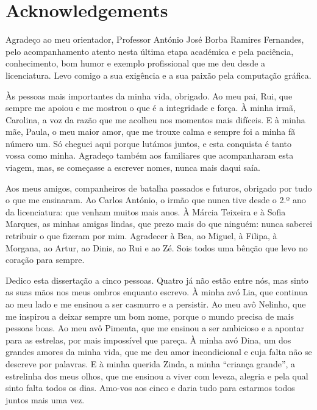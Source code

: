 \chapter*{Acknowledgements}
\setlength{\parskip}{1em}

Agradeço ao meu orientador, Professor António José Borba Ramires Fernandes, pelo acompanhamento atento nesta última etapa académica e pela paciência, conhecimento, bom humor e exemplo profissional que me deu desde a licenciatura. Levo comigo a sua exigência e a sua paixão pela computação gráfica.

Às pessoas mais importantes da minha vida, obrigado. Ao meu pai, Rui, que sempre me apoiou e me mostrou o que é a integridade e força. À minha irmã, Carolina, a voz da razão que me acolheu nos momentos mais difíceis. E à minha mãe, Paula, o meu maior amor, que me trouxe calma e sempre foi a minha fã número um. Só cheguei aqui porque lutámos juntos, e esta conquista é tanto vossa como minha. Agradeço também aos familiares que acompanharam esta viagem, mas, se começasse a escrever nomes, nunca mais daqui saía.

Aos meus amigos, companheiros de batalha passados e futuros, obrigado por tudo o que me ensinaram. Ao Carlos António, o irmão que nunca tive desde o 2.º ano da licenciatura: que venham muitos mais anos. À Márcia Teixeira e à Sofia Marques, as minhas amigas lindas, que prezo mais do que ninguém: nunca saberei retribuir o que fizeram por mim. Agradecer à Bea, ao Miguel, à Filipa, à Morgana, ao Artur, ao Dinis, ao Rui e ao Zé. Sois todos uma bênção que levo no coração para sempre.

Dedico esta dissertação a cinco pessoas. Quatro já não estão entre nós, mas sinto as suas mãos nos meus ombros enquanto escrevo. À minha avó Lia, que continua ao meu lado e me ensinou a ser casmurro e a persistir. Ao meu avô Nelinho, que me inspirou a deixar sempre um bom nome, porque o mundo precisa de mais pessoas boas. Ao meu avô Pimenta, que me ensinou a ser ambicioso e a apontar para as estrelas, por mais impossível que pareça. À minha avó Dina, um dos grandes amores da minha vida, que me deu amor incondicional e cuja falta não se descreve por palavras. E à minha querida Zinda, a minha “criança grande”, a estrelinha dos meus olhos, que me ensinou a viver com leveza, alegria e pela qual sinto falta todos os dias. Amo-vos aos cinco e daria tudo para estarmos todos juntos mais uma vez.

\setlength{\parskip}{0em}
